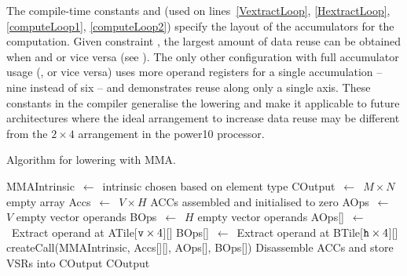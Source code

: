 \documentclass[\main/thesis.tex]{subfiles}
\begin{document}
The compile-time constants  and  (used on lines~\ref{VextractLoop}, \ref{HextractLoop}, \ref{computeLoop1}, \ref{computeLoop2}) specify the layout of the accumulators for the computation.
Given constraint , the largest amount of data reuse can be obtained when  and  or vice versa (see ).
The only other configuration with full accumulator usage (,  or vice versa) uses more operand registers for a single accumulation -- nine instead of six -- and demonstrates reuse along only a single axis.
These constants in the compiler generalise the lowering and make it applicable to future architectures where the ideal arrangement to increase data reuse may be different from the $2 \times 4$ arrangement in the \gls{power10} processor.

\begin{algorithm}[t]
  \caption[Algorithm for Lowering ]{Algorithm for lowering  with MMA.}
  \label{alg:intrinsic}
  \begin{algorithmic}[1]
    \State MMAIntrinsic~$\gets$~intrinsic chosen based on element type\label{chooseIntrinsic}
    \State COutput~$\gets$~$M \times N$ empty array\label{createC}
    \State Accs~$\gets$~$V \times H$ ACCs assembled and initialised to zero\label{zeroAccs}
    \label{unrollLoopStart}
      \State AOps~$\gets$~$V$ empty vector operands
      \State BOps~$\gets$~$H$ empty vector operands
      \label{VextractLoop}
        \State AOps[]~$\gets$~Extract operand at ATile[$\text{\code{v}} \times 4$][]\label{aOps}
        \EndFor
      \label{HextractLoop}
         \State BOps[]~$\gets$~Extract operand at BTile[$\text{\code{h}} \times 4$][]\label{bOps}
      \EndFor
      \label{computeLoop1}
        \label{computeLoop2}
          \State createCall(MMAIntrinsic, {Accs[][], AOps[], BOps[]})\label{intrinsicCallCreate}
        \EndFor
      \EndFor
    \EndFor\label{accLoopEnd}
    \State Disassemble ACCs and store VSRs into COutput\label{disStore}
    \State \Return COutput\label{return}
    \EndFunction
  \end{algorithmic}
\end{algorithm}
\end{document}
